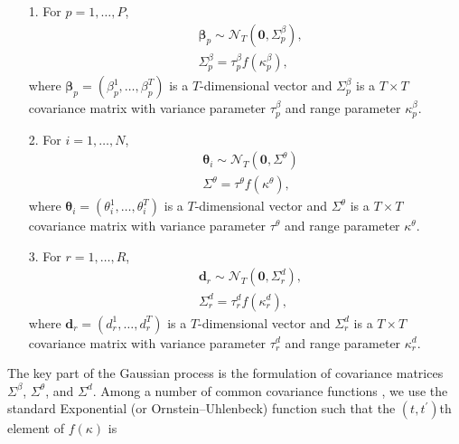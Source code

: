 \documentclass[a4paper]{article}
\begin{document}
\begin{center}
\begin{itemize}
	\item[1.] For $p = 1,\ldots,P$,
	\begin{equation*}
	\begin{aligned}
&	\boldsymbol{\beta}_{p}\sim \mathcal{N}_T(\boldsymbol{0}, \Sigma^\beta_p),\\
&\Sigma^\beta_p = \tau_p^\beta f(\kappa^\beta_{p}),
	\end{aligned}
	\end{equation*}
 where $\boldsymbol{\beta}_{p} = (\beta^1_p,\ldots, \beta^T_p)$ is a $T$-dimensional vector and $\Sigma^\beta_p$ is a $T \times T$ covariance matrix with variance parameter $\tau^{\beta}_p$ and range parameter $\kappa^\beta_{p}$. 
	\item[2.] For $i = 1,\ldots,N$, 
		\begin{equation*}
	\begin{aligned}
	&	\boldsymbol{\theta}_{i}\sim \mathcal{N}_T(\boldsymbol{0},\Sigma^\theta)\\
	&\Sigma^\theta = \tau^\theta f(\kappa^\theta),
	\end{aligned}
	\end{equation*}
	 where $\boldsymbol{\theta}_{i}= (\theta^1_i,\ldots, \theta^T_i)$ is a $T$-dimensional vector and $\Sigma^\theta$ is a $T\times T$ covariance matrix with variance parameter $\tau^{\theta}$ and range parameter $\kappa^\theta$. 
	\item[3.] For $r = 1,\ldots,R$, 
		\begin{equation*}
		\begin{aligned}
		&	\boldsymbol{d}_{r}\sim \mathcal{N}_T(\boldsymbol{0}, \Sigma^d_r),\\
		&\Sigma^d_r = \tau_r^d f(\kappa^d_{r}),
		\end{aligned}
		\end{equation*}
		where $\boldsymbol{d}_{r} = (d^1_r,\ldots,d^T_r)$ is a $T$-dimensional vector and $\Sigma^d_r$ is a $T\times T$ covariance matrix with variance parameter $\tau^{d}_r$ and range parameter $\kappa^d_{r}$. 
\end{itemize}
\end{center}
The key part of the Gaussian process is the formulation of covariance matrices $\Sigma^\beta$, $\Sigma^\theta$, and $\Sigma^d$. Among a number of common covariance functions \citep{rasmussen2004gaussian}, we use the standard Exponential (or Ornstein--Uhlenbeck) function such that the $(t, t^\prime)$th element of $f(\kappa)$ is
\end{document}
